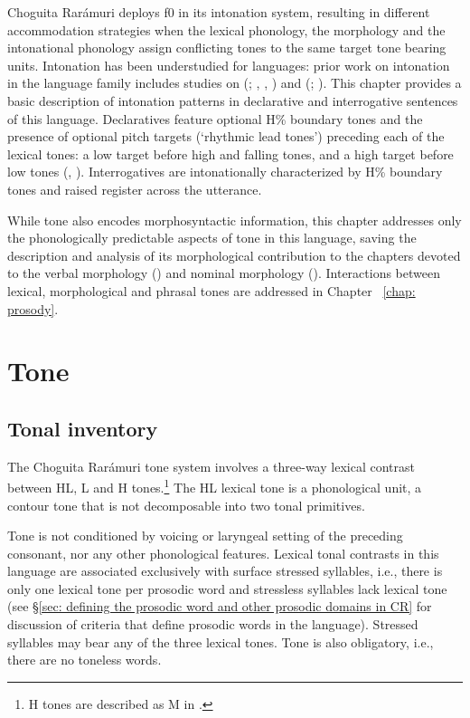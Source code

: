 Choguita Rarámuri deploys f0 in its intonation system, resulting in different accommodation strategies when the lexical phonology, the morphology and the intonational phonology assign conflicting tones to the same target tone bearing units. Intonation has been understudied for  languages: prior work on intonation in the language family includes studies on  (; \citealt{guion2010word}, \citealt{patino2014intonation}, \citealt{aguilar2020phonology}) and  (; \citealt{burgoinmarcacion}). This chapter provides a basic description of intonation patterns in declarative and interrogative sentences of this language. Declaratives feature optional H\% boundary tones and the presence of optional pitch targets (`rhythmic lead tones') preceding each of the lexical tones: a low target before high and falling tones, and a high target before low tones (\citealt{garellek2015lexical}, \citealt{kubuzono2020raramuri}). Interrogatives are intonationally characterized by H\% boundary tones and raised register across the utterance.

While tone also encodes morphosyntactic information, this chapter addresses only the phonologically predictable aspects of tone in this language, saving the description and analysis of its morphological contribution to the chapters devoted to the verbal morphology () and nominal morphology (). Interactions between lexical, morphological and phrasal tones are addressed in Chapter ~\ref{chap: prosody}.

\section{Tone}
\label{sec: tone}

\subsection{Tonal inventory}
\label{subsec: tonal inventory}

The Choguita Rarámuri tone system involves a three-way lexical contrast between HL, L and H tones.\footnote{H tones are described as M in \citet{caballero2015tone}.}  The HL lexical tone is a phonological unit, a contour tone that is not decomposable into two tonal primitives.

Tone is not conditioned by voicing or laryngeal setting of the preceding consonant, nor any other phonological features. Lexical tonal contrasts in this language are associated exclusively with surface stressed syllables, i.e., there is only one lexical tone per prosodic word and stressless syllables lack lexical tone (see §\ref{sec: defining the prosodic word and other prosodic domains in CR} for discussion of criteria that define prosodic words in the language). Stressed syllables may bear any of the three lexical tones. Tone is also obligatory, i.e., there are no toneless words.

